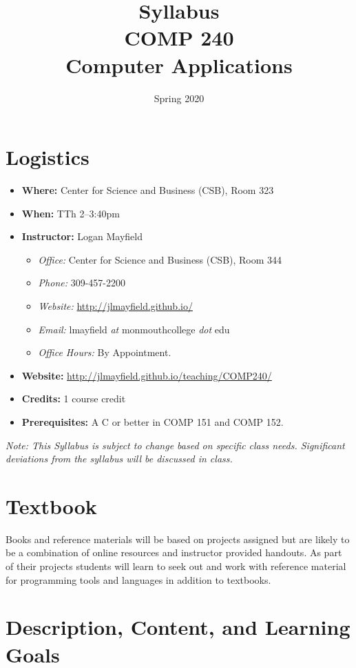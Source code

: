 \documentclass[10pt]{article}
\title{Syllabus \\ COMP 240 \\ Computer Applications}
\author{  }
\date{Spring 2020}
\begin{document}
\maketitle

\section{Logistics}
\begin{itemize}
\item \textbf{Where: } Center for Science and Business (CSB), Room 323
\item \textbf{When: } TTh 2--3:40pm
\item \textbf{Instructor: } Logan Mayfield
\begin{itemize}
\item \textit{Office: } Center for Science and Business (CSB), Room 344
\item \textit{Phone: } 309-457-2200 %
\item \textit{Website: } \url{http://jlmayfield.github.io/}
\item \textit{Email: } lmayfield \textit{at} monmouthcollege \textit{dot} edu
\item \textit{Office Hours: }  By Appointment.
\end{itemize}
\item \textbf{Website: } \url{http://jlmayfield.github.io/teaching/COMP240/}
\item \textbf{Credits: } 1 course credit
\item \textbf{Prerequisites: } A C or better in COMP 151 and COMP 152.
\end{itemize}
\emph{Note: This Syllabus is subject to change based on specific class needs. Significant deviations from the syllabus will be discussed in class.}

\section{Textbook}

Books and reference materials will be based on projects assigned but are likely to be a combination of online resources and instructor provided handouts. As part of their projects students will learn to seek out and work with reference material for programming tools and languages in addition to textbooks.

\section{Description, Content, and Learning Goals}
\end{document}
